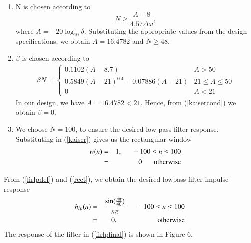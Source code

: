 \documentclass{article}
\begin{document}
\begin{enumerate}
\item  N is chosen according to
\begin{equation}
N \geq \frac{A-8}{4.57\Delta \omega},
\end{equation}
where $A = -20\log_{10}\delta$.  Substituting the appropriate values from the design specifications, we obtain
$A = 16.4782$ and $N \geq 48$.

\item  $\beta$ is chosen according to
\begin{eqnarray}
\label{kaisercond}
\beta N = \left\{ \begin{array}{ll} 0.1102(A-8.7) & A > 50 \\
0.5849(A-21)^{0.4}+ 0.07886(A-21) & 21 \leq A \leq 50 \\
0 & A < 21\end{array} \right.
\end{eqnarray}
In our design, we have $A = 16.4782 < 21$.  Hence, from (\ref{kaisercond}) we obtain $\beta = 0$.  

\item We choose $N = 100$, to ensure the desired low pass filter response.  Substituting in (\ref{kaiser})
gives us the rectangular window
\begin{eqnarray}
\label{rect}
w(n) &=& 1, \indent -100 \leq n \leq 100 \nonumber \\
&=& 0 \hspace{6mm} \mbox{otherwise}
\end{eqnarray}
\end{enumerate}

From (\ref{firlpdef}) and (\ref{rect}), we obtain the desired lowpass filter impulse response
\begin{eqnarray}
\label{firlpfinal}
h_{lp}(n) &=& \frac{\sin(\frac{n\pi}{40})}{n\pi} \indent -100 \leq n \leq 100 \nonumber \\
&=& 0, \hspace{2cm} \mbox{otherwise}
\end{eqnarray}
The response of the filter in (\ref{firlpfinal}) is shown in Figure 6.
\end{document}
